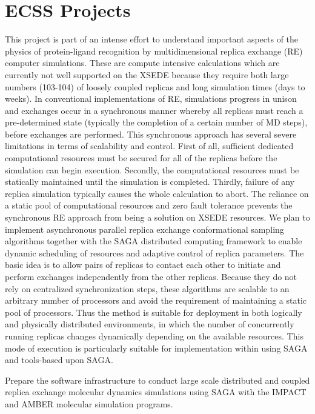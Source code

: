 \documentclass{sig-alternate}
\begin{document}
\section{ECSS Projects}

This project is part of an intense eﬀort to understand important aspects of the
physics of protein-ligand recognition by multidimensional replica exchange (RE)
computer simulations. These are compute intensive calculations which are
currently not well supported on the XSEDE because they require both large
numbers (103-104) of loosely coupled replicas and long simulation times (days to
weeks). In conventional implementations of RE, simulations progress in unison
and exchanges occur in a synchronous manner whereby all replicas must reach a
pre-determined state (typically the completion of a certain number of MD steps),
before exchanges are performed. This synchronous approach has several severe
limitations in terms of scalability and control. First of all, suﬃcient
dedicated computational resources must be secured for all of the replicas before
the simulation can begin execution. Secondly, the computational resources must
be statically maintained until the simulation is completed. Thirdly, failure of
any replica simulation typically causes the whole calculation to abort.
The reliance on a static pool of computational resources and zero fault
tolerance prevents the synchronous RE approach from being a solution on XSEDE
resources. We plan to implement asynchronous parallel replica exchange
conformational sampling algorithms together with the SAGA distributed computing
framework to enable dynamic scheduling of resources and adaptive control of
replica parameters. The basic idea is to allow pairs of replicas to contact each
other to initiate and perform exchanges independently from the other replicas.
Because they do not rely on centralized synchronization steps, these algorithms
are scalable to an arbitrary number of processors and avoid the requirement of
maintaining a static pool of processors. Thus the method is suitable for
deployment in both logically and physically distributed environments, in which
the number of concurrently running replicas changes dynamically depending on the
available resources. This mode of execution is particularly suitable for
implementation within using  SAGA and tools-based upon SAGA.

Prepare the software infrastructure to conduct large scale distributed and
coupled replica exchange molecular dynamics simulations using SAGA with the
IMPACT and AMBER molecular simulation programs.
\end{document}
